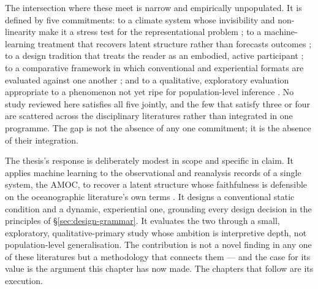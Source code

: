 The intersection where these meet is narrow and empirically unpopulated. It is defined by five commitments: to a climate system whose invisibility and non-linearity make it a stress test for the representational problem \citep{lenton2008, armstrongmckay2022}; to a machine-learning treatment that recovers latent structure rather than forecasts outcomes \citep{sonnewald2019, iten2020}; to a design tradition that treats the reader as an embodied, active participant \citep{lakoff1999, jansen2015, marriott2018}; to a comparative framework in which conventional and experiential formats are evaluated against one another \citep{harold2016, kause2020}; and to a qualitative, exploratory evaluation appropriate to a phenomenon not yet ripe for population-level inference \citep{braunclarke2006, smithmcgannon2018}. No study reviewed here satisfies all five jointly, and the few that satisfy three or four are scattered across the disciplinary literatures rather than integrated in one programme. The gap is not the absence of any one commitment; it is the absence of their integration.

The thesis's response is deliberately modest in scope and specific in claim. It applies machine learning to the observational and reanalysis records of a single system, the AMOC, to recover a latent structure whose faithfulness is defensible on the oceanographic literature's own terms \citep{hannachi2007, buckley2016}. It designs a conventional static condition and a dynamic, experiential one, grounding every design decision in the principles of §\ref{sec:design-grammar}. It evaluates the two through a small, exploratory, qualitative-primary study whose ambition is interpretive depth, not population-level generalisation. The contribution is not a novel finding in any one of these literatures but a methodology that connects them --- and the case for its value is the argument this chapter has now made. The chapters that follow are its execution.
